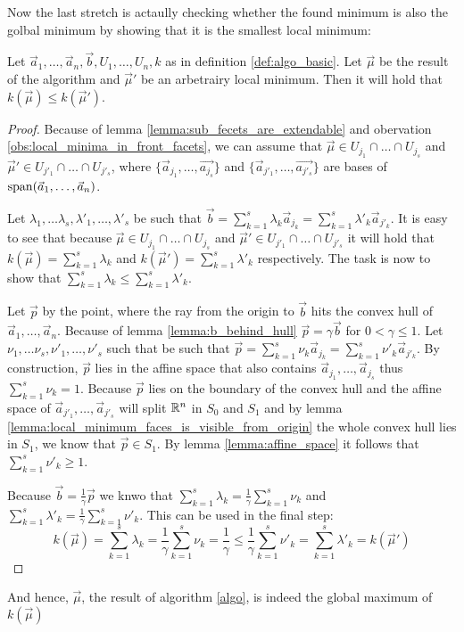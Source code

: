 Now the last stretch is actaully checking whether the found minimum is also the golbal minimum by showing that it is the smallest local minimum:
\begin{lemma}
    Let $\vec a_1, \dots, \vec a_n, \vec b, U_1, \dots, U_n, k$ as in definition \ref{def:algo_basic}. Let $\vec \mu$ be the result of the algorithm and $\vec\mu'$ be an arbetrairy local minimum. Then it will hold that $k(\vec\mu) \leq k(\vec\mu')$.
\end{lemma}
\begin{proof}
    Because of lemma \ref{lemma:sub_fecets_are_extendable} and obervation \ref{obs:local_minima_in_front_facets}, we can assume that $\vec\mu \in U_{j_1} \cap \dots \cap U_{j_s}$ and $\vec\mu' \in U_{j'_1} \cap \dots \cap U_{j'_s}$, where $\{\vec a_{j_1}, \dots, \vec {a_{j_s}}\}$ and $\{\vec a_{j'_1}, \dots, \vec {a_{j'_s}}\}$ are bases of $\operatorname{span}(\vec a_1, \dots, \vec a_n)$.
    
    Let $\lambda_1, \dots \lambda_s, \lambda'_1, \dots, \lambda'_s$ be such that $\vec b = \sum_{k=1}^{s}\lambda_k \vec a_{j_k} = \sum_{k=1}^{s}\lambda'_k \vec a_{j'_k}$. It is easy to see that because $\vec\mu \in U_{j_1} \cap \dots \cap U_{j_s}$ and $\vec\mu' \in U_{j'_1} \cap \dots \cap U_{j'_s}$ it will hold that $k(\vec\mu) = \sum_{k=1}^{s}\lambda_k$ and $k(\vec\mu') = \sum_{k=1}^{s}\lambda'_k$ respectively. The task is now to show that $\sum_{k=1}^{s}\lambda_k \leq \sum_{k=1}^{s}\lambda'_k$.

    Let $\vec p$ by the point, where the ray from the origin to $\vec b$ hits the convex hull of $\vec a_1, \dots, \vec a_n$. Because of lemma \ref{lemma:b_behind_hull} $\vec p = \gamma\vec b$ for $0 < \gamma \leq 1$. Let $\nu_1, \dots \nu_s, \nu'_1, \dots, \nu'_s$ such that be such that $\vec p = \sum_{k=1}^{s}\nu_k \vec a_{j_k} = \sum_{k=1}^{s}\nu'_k \vec a_{j'_k}$. By construction, $\vec p$ lies in the affine space that also contains $\vec a_{j_1}, \dots, \vec a_{j_s}$ thus $\sum_{k=1}^{s}\nu_k = 1$. Because $\vec p$ lies on the boundary of the convex hull and the affine space of $\vec a_{j'_1}, \dots, \vec a_{j'_s}$ will split $\mathbb{R}^n$ in $S_0$ and $S_1$ and by lemma \ref{lemma:local_minimum_faces_is_visible_from_origin} the whole convex hull lies in $S_1$, we know that $\vec p\in S_1$. By lemma \ref{lemma:affine_space} it follows that $\sum_{k=1}^{s}\nu'_k \geq 1$.

    Because $\vec b = \frac{1}{\gamma}\vec p$ we knwo that $\sum_{k=1}^{s}\lambda_k = \frac{1}{\gamma} \sum_{k=1}^{s}\nu_k$ and $\sum_{k=1}^{s}\lambda'_k = \frac{1}{\gamma} \sum_{k=1}^{s}\nu'_k$. This can be used in the final step:
    $$k(\vec\mu) = \sum_{k=1}^{s}\lambda_k = \frac{1}{\gamma} \sum_{k=1}^{s}\nu_k = \frac{1}{\gamma} \leq \frac{1}{\gamma} \sum_{k=1}^{s}\nu'_k = \sum_{k=1}^{s}\lambda'_k = k(\vec\mu')$$
\end{proof}
And hence, $\vec\mu$, the result of algorithm \ref{algo}, is indeed the global maximum of $k(\vec\mu)$

